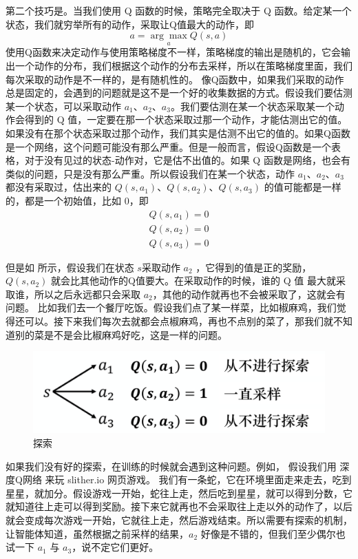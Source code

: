 第二个技巧是。当我们使用 Q 函数的时候，策略完全取决于 Q 函数。给定某一个状态，我们就穷举所有的动作，采取让Q值最大的动作，即
\begin{equation}
    \label{eq:}
    a=\underset{a}{\arg \max} Q(s, a)
\end{equation}
使用Q函数来决定动作与使用策略梯度不一样，策略梯度的输出是随机的，它会输出一个动作的分布，我们根据这个动作的分布去采样，所以在策略梯度里面，我们每次采取的动作是不一样的，是有随机性的。
像Q函数中，如果我们采取的动作总是固定的，会遇到的问题就是这不是一个好的收集数据的方式。假设我们要估测某一个状态，可以采取动作 $a_{1}$、$a_{2}$、$a_{3}$。我们要估测在某一个状态采取某一个动作会得到的 Q 值，一定要在那一个状态采取过那一个动作，才能估测出它的值。如果没有在那个状态采取过那个动作，我们其实是估测不出它的值的。如果Q函数是一个网络，这个问题可能没有那么严重。但是一般而言，假设Q函数是一个表格，对于没有见过的状态-动作对，它是估不出值的。如果 Q 函数是网络，也会有类似的问题，只是没有那么严重。所以假设我们在某一个状态，动作 $a_{1}$、$a_{2}$、$a_{3}$ 都没有采取过，估出来的 $Q(s,a_{1})$、$Q(s,a_{2})$、$Q(s,a_{3})$ 的值可能都是一样的，都是一个初始值，比如 0，即
\begin{equation}
    \label{eq:}
    \begin{array}{l}
        Q(s, a_1)=0 \\
        Q(s, a_2)=0 \\
        Q(s, a_3)=0
        \end{array}
\end{equation}

但是如 所示，假设我们在状态 $s$采取动作 $a_{2}$ ，它得到的值是正的奖励，$Q(s, a_2)$ 就会比其他动作的Q值要大。在采取动作的时候，谁的 Q 值 最大就采取谁，所以之后永远都只会采取 $a_{2}$，其他的动作就再也不会被采取了，这就会有问题。
比如我们去一个餐厅吃饭。假设我们点了某一样菜，比如椒麻鸡，我们觉得还可以。接下来我们每次去就都会点椒麻鸡，再也不点别的菜了，那我们就不知道别的菜是不是会比椒麻鸡好吃，这是一样的问题。

\begin{figure}[hbt]
    \centering
    \includegraphics[width=0.5\linewidth]{res/ch6/6.16}
    \caption{探索}
    \label{fig:fig6.16}
\end{figure}

如果我们没有好的探索，在训练的时候就会遇到这种问题。例如， 假设我们用 深度Q网络 来玩 slither.io 网页游戏。 我们有一条蛇，它在环境里面走来走去，吃到星星，就加分。假设游戏一开始，蛇往上走，然后吃到星星，就可以得到分数，它就知道往上走可以得到奖励。接下来它就再也不会采取往上走以外的动作了，以后就会变成每次游戏一开始，它就往上走，然后游戏结束。所以需要有探索的机制，让智能体知道，虽然根据之前采样的结果，$a_2$ 好像是不错的，但我们至少偶尔也试一下 $a_{1}$ 与 $a_{3}$，说不定它们更好。

